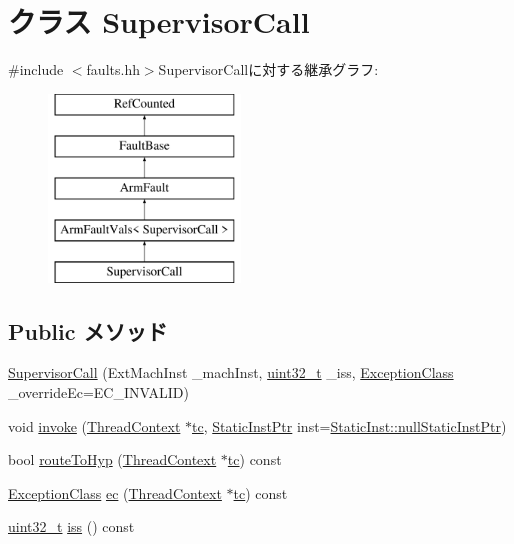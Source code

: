 \hypertarget{classArmISA_1_1SupervisorCall}{
\section{クラス SupervisorCall}
\label{classArmISA_1_1SupervisorCall}
}


{\ttfamily \#include $<$faults.hh$>$}SupervisorCallに対する継承グラフ:\begin{figure}[H]
\begin{center}
\leavevmode
\includegraphics[height=5cm]{classArmISA_1_1SupervisorCall}
\end{center}
\end{figure}
\subsection*{Public メソッド}
\begin{DoxyCompactItemize}
\item 
\hyperlink{classArmISA_1_1SupervisorCall_a138ed4243912a600cdc9e392d4522e57}{SupervisorCall} (ExtMachInst \_\-machInst, \hyperlink{Type_8hh_a435d1572bf3f880d55459d9805097f62}{uint32\_\-t} \_\-iss, \hyperlink{namespaceArmISA_a04034d12009cf36227f4d2abff3331a2}{ExceptionClass} \_\-overrideEc=EC\_\-INVALID)
\item 
void \hyperlink{classArmISA_1_1SupervisorCall_a2bd783b42262278d41157d428e1f8d6f}{invoke} (\hyperlink{classThreadContext}{ThreadContext} $\ast$\hyperlink{namespaceArmISA_a5aff829af55e65b802d83dfcef4e9dd0}{tc}, \hyperlink{classRefCountingPtr}{StaticInstPtr} inst=\hyperlink{classStaticInst_aa793d9793af735f09096369fb17567b6}{StaticInst::nullStaticInstPtr})
\item 
bool \hyperlink{classArmISA_1_1SupervisorCall_a16facd13ba8e6d15d2b865882c379d5f}{routeToHyp} (\hyperlink{classThreadContext}{ThreadContext} $\ast$\hyperlink{namespaceArmISA_a5aff829af55e65b802d83dfcef4e9dd0}{tc}) const 
\item 
\hyperlink{namespaceArmISA_a04034d12009cf36227f4d2abff3331a2}{ExceptionClass} \hyperlink{classArmISA_1_1SupervisorCall_aefab73b22a74d7c48b8a23230906d7cd}{ec} (\hyperlink{classThreadContext}{ThreadContext} $\ast$\hyperlink{namespaceArmISA_a5aff829af55e65b802d83dfcef4e9dd0}{tc}) const 
\item 
\hyperlink{Type_8hh_a435d1572bf3f880d55459d9805097f62}{uint32\_\-t} \hyperlink{classArmISA_1_1SupervisorCall_a54f4d33ac162a95fd5b3830cf7fab8ff}{iss} () const 
\end{DoxyCompactItemize}
